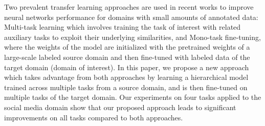 Two prevalent transfer learning approaches are used in recent works to improve neural networks performance for domains with small amounts of annotated data: Multi-task learning which involves training the task of interest with related auxiliary tasks to exploit their underlying similarities, and Mono-task fine-tuning, where the weights of the model are initialized with the pretrained weights of a large-scale labeled source domain and then fine-tuned with labeled data of the target domain (domain of interest). In this paper, we propose a new approach which takes advantage from both approaches by learning a hierarchical model trained across multiple tasks from a source domain, and is then fine-tuned on multiple tasks of the target domain. Our experiments on four tasks applied to the social media domain show that our proposed approach leads to significant improvements on all tasks compared to both approaches.
